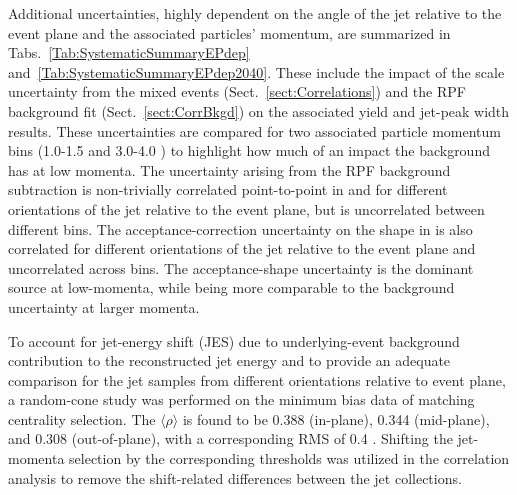 Additional uncertainties, highly dependent on the angle of the jet relative to the event plane and the associated particles' momentum, are summarized in Tabs.~\ref{Tab:SystematicSummaryEPdep} and~\ref{Tab:SystematicSummaryEPdep2040}.  These include the impact of the scale uncertainty from the mixed events (Sect.~\ref{sect:Correlations}) and the RPF background fit (Sect.~\ref{sect:CorrBkgd}) on the associated yield and jet-peak width results.  These uncertainties are compared for two associated particle momentum bins (1.0-1.5 and 3.0-4.0 \GeVc) to highlight how much of an impact the background has at low momenta.  The uncertainty arising from the RPF background subtraction is non-trivially correlated point-to-point in \dphi and for different orientations of the jet relative to the event plane, but is uncorrelated between different  bins.  The acceptance-correction uncertainty on the shape in \deta is also correlated for different orientations of the jet relative to the event plane and uncorrelated across  bins.  The acceptance-shape uncertainty is the dominant source at low-momenta, while being more comparable to the background uncertainty at larger momenta.  

To account for jet-energy shift (JES) due to underlying-event background contribution to the reconstructed jet energy and to provide an adequate comparison for the jet samples from different orientations relative to event plane, a random-cone study was performed on the minimum bias data of matching centrality selection. The $\langle\rho\rangle$ is found to be 0.388 \GeVc (in-plane), 0.344 \GeVc (mid-plane), and 0.308 \GeVc (out-of-plane), with a corresponding RMS of 0.4 \GeVc. Shifting the jet-momenta selection by the corresponding thresholds was utilized in the correlation analysis to remove the shift-related differences between the jet collections.



